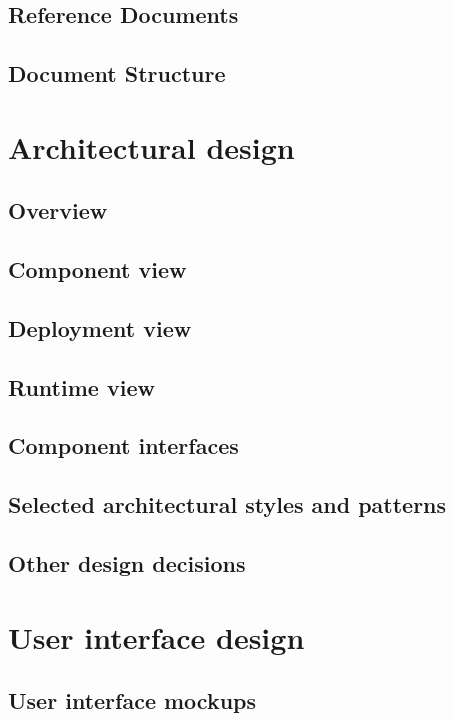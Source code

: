     \section{Reference Documents}
        
    \section{Document Structure}
    	
    
\newpage
\chapter{Architectural design}
    \section{Overview}
    	
    \section{Component view} \label{sec:components}
    	
    \section{Deployment view}
    	
    \section{Runtime view}
    	
    \section{Component interfaces}
    		\label{sec:interfaces}
    \section{Selected architectural styles and patterns}
    	
    \section{Other design decisions}
\newpage
\chapter{User interface design}
	\section{User interface mockups}
		
\newpage
